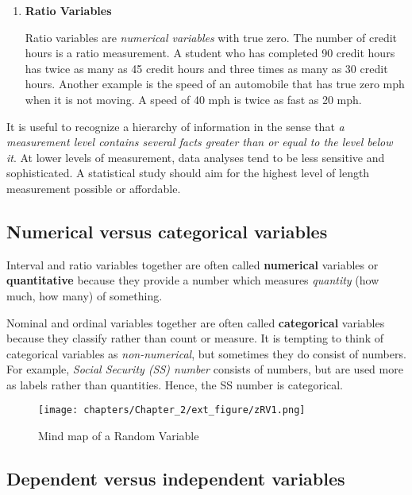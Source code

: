 \documentclass[11pt]{book}\usepackage[]{graphicx}\usepackage[]{color}
\begin{document}
\begin{enumerate}
\item \textbf{Ratio Variables}

Ratio variables are \textit{numerical variables} with true zero.  The number of credit hours is a ratio measurement.  A student who has completed 90 credit hours has twice as many as 45 credit hours and three times as many as 30 credit hours.  Another example is the speed of an automobile that has true zero mph when it is not moving.  A speed of 40 mph is twice as fast as 20 mph.
\end{enumerate}

It is useful to recognize a hierarchy of information in the sense that \textit{a measurement level contains several facts greater than or equal to the level below it}.  At lower levels of measurement, data analyses tend to be less sensitive and sophisticated.  A statistical study should aim for the highest level of length measurement possible or affordable.

\subsection{Numerical versus categorical variables}

Interval and ratio variables together are often called \textbf{numerical} variables or \textbf{quantitative} because they provide a number which measures \textit{quantity} (how much, how many) of something.

Nominal and ordinal variables together are often called \textbf{categorical} variables because they classify rather than count or measure.  It is tempting to think of categorical variables as \textit{non-numerical}, but sometimes they do consist of numbers.  For example, \textit{Social Security (SS) number} consists of numbers, but are used more as labels rather than quantities.  Hence, the SS number is categorical.

\begin{figure}[htbp]
   \centering

   \caption{Mind map of a Random Variable}

   \texttt{[image: chapters/Chapter\_2/ext\_figure/zRV1.png]} %

\end{figure}


\subsection{Dependent versus independent variables}     
\end{document}
